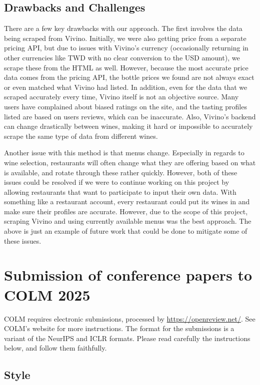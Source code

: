 \documentclass{article} %
\begin{document}
\subsection{Drawbacks and Challenges}

There are a few key drawbacks with our approach. The first involves the data being scraped from Vivino. Initially, we were also getting price from a separate pricing API, but due to issues with Vivino's currency (occasionally returning in other currencies like TWD with no clear conversion to the USD amount), we scrape these from the HTML as well. However, because the most accurate price data comes from the pricing API, the bottle prices we found are not always exact or even matched what Vivino had listed. In addition, even for the data that we scraped accurately every time, Vivino itself is not an objective source. Many users have complained about biased ratings on the site, and the tasting profiles listed are based on users reviews, which can be inaccurate. Also, Vivino's backend can change drastically between wines, making it hard or impossible to accurately scrape the same type of data from different wines.

Another issue with this method is that menus change. Especially in regards to wine selection, restaurants will often change what they are offering based on what is available, and rotate through these rather quickly. However, both of these issues could be resolved if we were to continue working on this project by allowing restaurants that want to participate to input their own data. With something like a restaurant account, every restaurant could put its wines in and make sure their profiles are accurate. However, due to the scope of this project, scraping Vivino and using currently available menus was the best approach. The above is just an example of future work that could be done to mitigate some of these issues.

\section{Submission of conference papers to COLM 2025}

COLM requires electronic submissions, processed by
\url{https://openreview.net/}. See COLM's website for more instructions.
The format for the submissions is a variant of the NeurIPS and ICLR formats.
Please read carefully the instructions below, and follow them
faithfully.


\subsection{Style}
\end{document}
